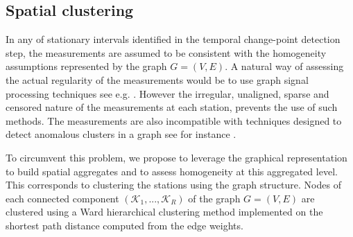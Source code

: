 \subsection{Spatial clustering}\label{section:spaceclust}

In any of stationary intervals identified in the temporal change-point detection step, the measurements are assumed to be consistent with the homogeneity assumptions represented by the graph $G=(V, E)$. A natural way of assessing the actual regularity of the measurements would be to use graph signal processing techniques see e.g. \cite{8347162, 6494675}. However the irregular, unaligned, sparse and censored nature of the measurements at each station, prevents the use of such methods. The measurements are also incompatible with techniques designed to detect anomalous clusters in a graph see for instance \cite{10.1214/10-AOS839}.

To circumvent this problem, we propose to leverage the graphical representation to build spatial aggregates and to assess homogeneity at this aggregated level. This corresponds to clustering the stations using the graph structure. Nodes of each connected component $(\mathcal{K}_1,...,\mathcal{K}_R)$ of the graph $G=(V, E)$ are clustered using a Ward hierarchical clustering method implemented on the shortest path distance computed from the edge weights. 

